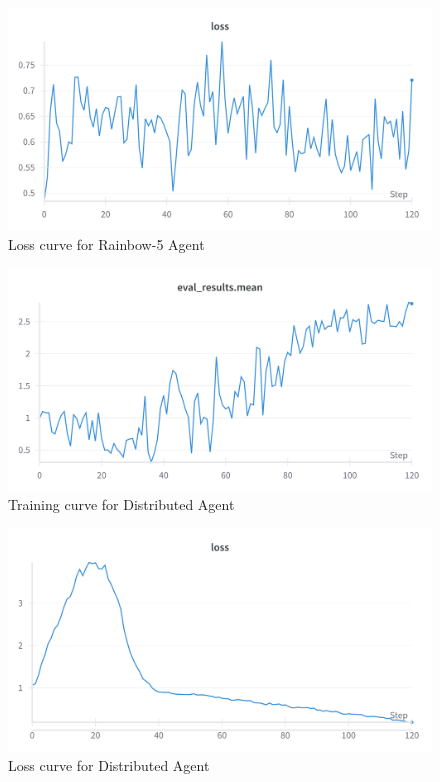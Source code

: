 \begin{figure}[h]
  \centering
  \includegraphics[width=\linewidth]{results/RAINBOW-5-loss.png}
  \caption{
      Loss curve for Rainbow-5 Agent
  }
  \label{fig:rainbow5loss}
\end{figure}


  \begin{figure}[h]
    \centering
    \includegraphics[width=\linewidth]{results/Distributed-mean.png}
    \caption{
      Training curve for Distributed Agent
    }
    \label{fig:distributed}
  \end{figure}


\begin{figure}[h]
  \centering
  \includegraphics[width=\linewidth]{results/Distributed-loss.png}
  \caption{
      Loss curve for Distributed Agent
  }
  \label{fig:distributedloss}
\end{figure}

